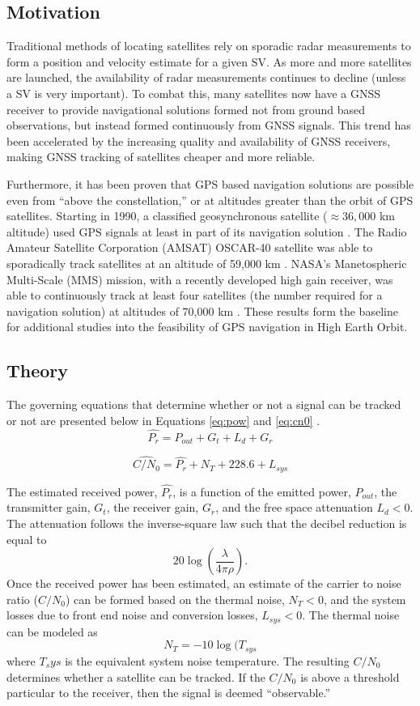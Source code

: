 \documentclass[11pt]{article}
\newcommand{\cnr}{C/N_0}
\begin{document}
\subsection{Motivation}
Traditional methods of locating satellites rely on sporadic radar measurements to form a position and velocity estimate for a given SV. As more and more satellites are launched, the availability of radar measurements continues to decline (unless a SV is very important). To combat this, many satellites now have a GNSS receiver to provide navigational solutions formed not from ground based observations, but instead formed continuously from GNSS signals. This trend has been accelerated by the increasing quality and availability of GNSS receivers, making GNSS tracking of satellites cheaper and more reliable.

Furthermore, it has been proven that GPS based navigation solutions are possible even from ``above the constellation,'' or at altitudes greater than the orbit of GPS satellites. Starting in 1990, a classified geosynchronous satellite ($\approx 36,000$ km altitude) used GPS signals at least in part of its navigation solution \cite{class}. The Radio Amateur Satellite Corporation (AMSAT) OSCAR-40 satellite was able to sporadically track satellites at an altitude of 59,000 km \cite{ao40}. NASA's Manetospheric Multi-Scale (MMS) mission, with a recently developed high gain receiver, was able to continuously track at least four satellites (the number required for a navigation solution) at altitudes of 70,000 km \cite{ssv}. These results form the baseline for additional studies into the feasibility of GPS navigation in High Earth Orbit.

\subsection{Theory}
The governing equations that determine whether or not a signal can be tracked or not are presented below in Equations \ref{eq:pow} and \ref{eq:cn0} \cite{ao40}.
\begin{equation}
\hat{P_r} = P_{out} + G_t + L_d + G_r
\label{eq:pow}
\end{equation}

\begin{equation}
\widehat{C/N_0} = \hat{P_r} + N_T + 228.6 + L_{sys}
\label{eq:cn0}
\end{equation}

The estimated received power, $\hat{P_r}$, is a function of the emitted power, $P_{out}$, the transmitter gain, $G_t$, the receiver gain, $G_r$, and the free space attenuation $L_d < 0$. The attenuation follows the inverse-square law such that the decibel reduction is equal to \[ 20\log(\frac{\lambda}{4\pi \rho}). \] Once the received power has been estimated, an estimate of the carrier to noise ratio ($\cnr$) can be formed based on the thermal noise, $N_T < 0$, and the system losses due to front end noise and conversion losses, $L_{sys} < 0$. The thermal noise can be modeled as \[ N_T = -10 \log(T_{sys} \] where $T_sys$ is the equivalent system noise temperature. The resulting $\cnr$ determines whether a satellite can be tracked. If the $\cnr$ is above a threshold particular to the receiver, then the signal is deemed ``observable.'' 
\end{document}
